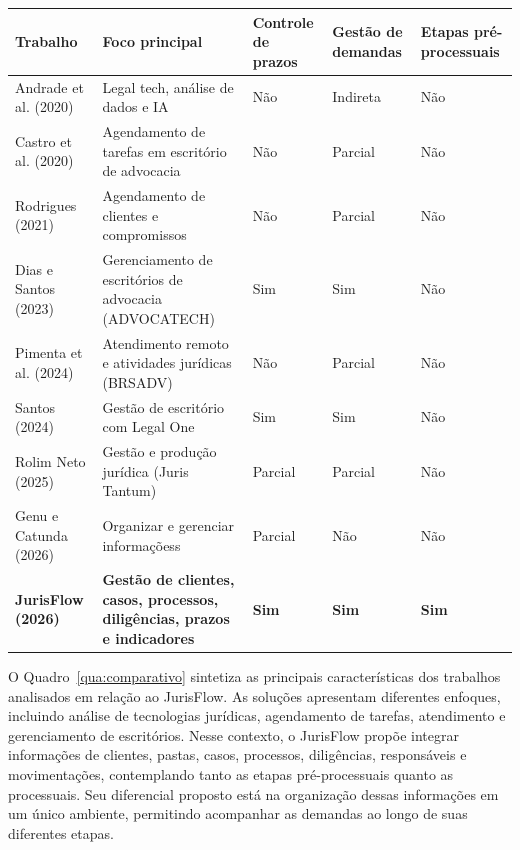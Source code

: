 \begin{quadro}[H]
\centering
\caption{Comparação entre os trabalhos correlatos e o JurisFlow}
\label{qua:comparativo}
\renewcommand{\arraystretch}{1.3}
\begin{tabular}{|p{3cm}|p{4.5cm}|p{1.8cm}|p{1.8cm}|p{1.8cm}|}
\hline
\textbf{Trabalho} & \textbf{Foco principal} & \textbf{Controle de prazos} & \textbf{Gestão de demandas} & \textbf{Etapas pré-processuais} \\
\hline
\hline
Andrade et al. (2020) & Legal tech, análise de dados e IA & Não & Indireta & Não \\
\hline
Castro et al. (2020) & Agendamento de tarefas em escritório de advocacia & Não & Parcial & Não \\
\hline
Rodrigues (2021) & Agendamento de clientes e compromissos & Não & Parcial & Não \\
\hline
Dias e Santos (2023) & Gerenciamento de escritórios de advocacia (ADVOCATECH) & Sim & Sim & Não \\
\hline
Pimenta et al. (2024) & Atendimento remoto e atividades jurídicas (BRSADV) & Não & Parcial & Não \\
\hline
Santos (2024) & Gestão de escritório com Legal One & Sim & Sim & Não \\
\hline
Rolim Neto (2025) & Gestão e produção jurídica (Juris Tantum) & Parcial & Parcial & Não \\
\hline
Genu e Catunda (2026) & Organizar e gerenciar informaçõess & Parcial & Não & Não \\
\hline
\textbf{JurisFlow (2026)} & \textbf{Gestão de clientes, casos, processos, diligências, prazos e indicadores} & \textbf{Sim} & \textbf{Sim} & \textbf{Sim} \\
\hline
\end{tabular}
\end{quadro}



O Quadro~\ref{qua:comparativo} sintetiza as principais características dos trabalhos analisados em relação ao JurisFlow. As soluções apresentam diferentes enfoques, incluindo análise de tecnologias jurídicas, agendamento de tarefas, atendimento e gerenciamento de escritórios. Nesse contexto, o JurisFlow propõe integrar informações de clientes, pastas, casos, processos, diligências, responsáveis e movimentações, contemplando tanto as etapas pré-processuais quanto as processuais. Seu diferencial proposto está na organização dessas informações em um único ambiente, permitindo acompanhar as demandas ao longo de suas diferentes etapas.